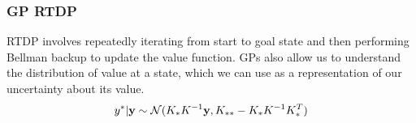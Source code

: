 \documentclass[10pt]{beamer}
\begin{document}
\begin{frame}
\frametitle{GP RTDP}
RTDP involves repeatedly iterating from start to goal state and then performing Bellman backup to update the value function.   
\newline  \newline
GPs also allow us to understand the distribution of value at a state, which we can use as a representation of our uncertainty about its value.
\begin{equation*}    %
	y^{*}|\bold{y} \sim \mathcal{N}(K_{*}K^{-1}\bold{y}, K_{**} - K_{*}K^{-1}K_{*}^{T})
\end{equation*}
\end{frame}
 
\end{document}
